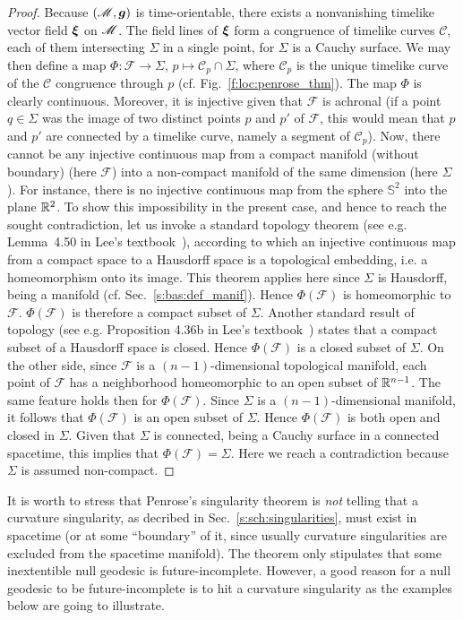 \begin{proof}
Because $(\mathscr{M},\bm{g})$ is time-orientable, there exists a nonvanishing
timelike vector field $\bm{\xi}$ on $\mathscr{M}$. The field lines of $\bm{\xi}$
form a congruence of timelike curves $\mathscr{C}$, each of them intersecting
$\Sigma$ in a single point, for $\Sigma$ is a Cauchy surface.
We may then define a map $\Phi: \mathscr{F} \to \Sigma$,
$p \mapsto \mathscr{C}_p \cap \Sigma$, where $\mathscr{C}_p$ is the unique
timelike curve of the $\mathscr{C}$ congruence through $p$ (cf. Fig.~\ref{f:loc:penrose_thm}).
The map $\Phi$ is clearly continuous. Moreover, it is injective given that
$\mathscr{F}$ is achronal (if a point $q\in\Sigma$ was the image of two distinct
points $p$ and $p'$ of $\mathscr{F}$, this would mean that $p$ and $p'$
are connected by a timelike curve, namely a segment of $\mathscr{C}_p$).
Now, there cannot be any injective continuous map from a
compact manifold (without boundary) (here $\mathscr{F}$)
into a non-compact manifold of the same dimension (here $\Sigma$). For instance,
there is no injective continuous map from the sphere $\mathbb{S}^2$ into
the plane $\mathbb{R}^2$. To show this impossibility in the present case, and hence
to reach the sought contradiction, let us invoke a
standard topology theorem (see e.g. Lemma~4.50
in Lee's textbook~\cite{Lee11}), according to which an injective continuous map
from a compact space to a Hausdorff space
is a topological embedding, i.e. a homeomorphism onto its image. This theorem applies here
since $\Sigma$ is Hausdorff, being a manifold (cf. Sec.~\ref{s:bas:def_manif}).
Hence $\Phi(\mathscr{F})$ is homeomorphic to $\mathscr{F}$.
$\Phi(\mathscr{F})$ is therefore a compact subset of $\Sigma$.
Another standard result of topology (see e.g. Proposition 4.36b in Lee's textbook~\cite{Lee11})
states that a compact subset of a Hausdorff space is closed. Hence $\Phi(\mathscr{F})$
is a closed subset of $\Sigma$.
On the other side, since $\mathscr{F}$ is a $(n-1)$-dimensional topological manifold,
each point of $\mathscr{F}$
has a neighborhood homeomorphic to an open subset of $\mathbb{R}^{n-1}$. The same feature holds then for
$\Phi(\mathscr{F})$. Since $\Sigma$ is a $(n-1)$-dimensional manifold, it follows that
$\Phi(\mathscr{F})$ is an open subset of $\Sigma$. Hence $\Phi(\mathscr{F})$ is both open
and closed in $\Sigma$. Given that $\Sigma$ is connected, being a Cauchy surface in
a connected spacetime, this implies that
$\Phi(\mathscr{F}) = \Sigma$. Here we reach a contradiction because $\Sigma$
is assumed non-compact.
\end{proof}

It is worth to stress that Penrose's singularity theorem is \emph{not}
telling that a curvature singularity, as decribed in Sec.~\ref{s:sch:singularities},
must exist in spacetime (or at some ``boundary'' of it, since
usually curvature singularities are excluded from the spacetime manifold).
The theorem only stipulates that some inextentible null geodesic is future-incomplete. However,
a good reason for a null geodesic to be future-incomplete is to hit a curvature singularity
as the examples below are going to illustrate.

